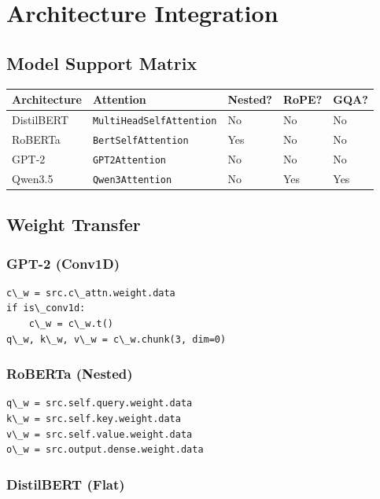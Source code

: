 
\section{Architecture Integration}

\subsection{Model Support Matrix}

\begin{table}[H]
\centering
\small
\begin{tabular}{lllll}
\toprule
\textbf{Architecture} & \textbf{Attention} & \textbf{Nested?} & \textbf{RoPE?} & \textbf{GQA?} \\
\midrule
DistilBERT & \texttt{MultiHeadSelfAttention} & No & No & No \\
RoBERTa & \texttt{BertSelfAttention} & Yes & No & No \\
GPT-2 & \texttt{GPT2Attention} & No & No & No \\
Qwen3.5 & \texttt{Qwen3Attention} & No & Yes & Yes \\
\bottomrule
\end{tabular}
\end{table}

\subsection{Weight Transfer}

\subsubsection{GPT-2 (Conv1D)}

\begin{lstlisting}
c\_w = src.c\_attn.weight.data
if is\_conv1d:
    c\_w = c\_w.t()
q\_w, k\_w, v\_w = c\_w.chunk(3, dim=0)
\end{lstlisting}

\subsubsection{RoBERTa (Nested)}

\begin{lstlisting}
q\_w = src.self.query.weight.data
k\_w = src.self.key.weight.data
v\_w = src.self.value.weight.data
o\_w = src.output.dense.weight.data
\end{lstlisting}

\subsubsection{DistilBERT (Flat)}


